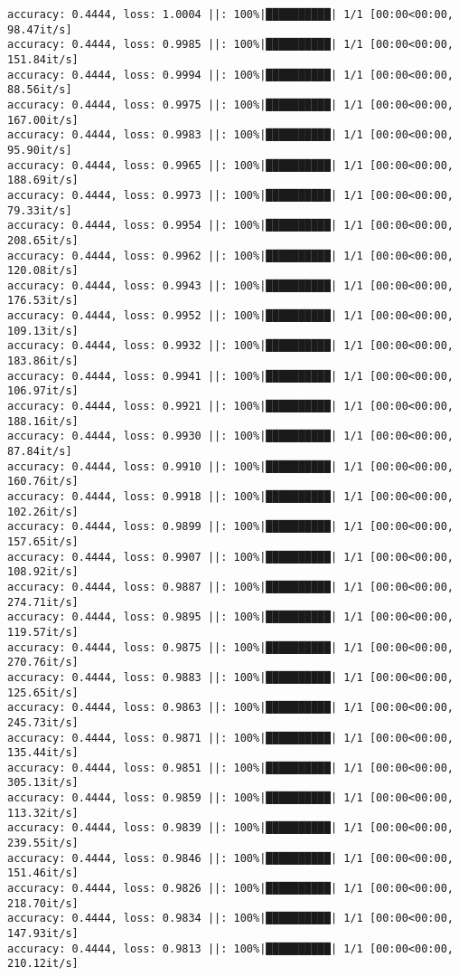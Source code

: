 \documentclass[
]{article}
\begin{document}
\begin{verbatim}
accuracy: 0.4444, loss: 1.0004 ||: 100%|██████████| 1/1 [00:00<00:00, 98.47it/s]
accuracy: 0.4444, loss: 0.9985 ||: 100%|██████████| 1/1 [00:00<00:00, 151.84it/s]
accuracy: 0.4444, loss: 0.9994 ||: 100%|██████████| 1/1 [00:00<00:00, 88.56it/s]
accuracy: 0.4444, loss: 0.9975 ||: 100%|██████████| 1/1 [00:00<00:00, 167.00it/s]
accuracy: 0.4444, loss: 0.9983 ||: 100%|██████████| 1/1 [00:00<00:00, 95.90it/s]
accuracy: 0.4444, loss: 0.9965 ||: 100%|██████████| 1/1 [00:00<00:00, 188.69it/s]
accuracy: 0.4444, loss: 0.9973 ||: 100%|██████████| 1/1 [00:00<00:00, 79.33it/s]
accuracy: 0.4444, loss: 0.9954 ||: 100%|██████████| 1/1 [00:00<00:00, 208.65it/s]
accuracy: 0.4444, loss: 0.9962 ||: 100%|██████████| 1/1 [00:00<00:00, 120.08it/s]
accuracy: 0.4444, loss: 0.9943 ||: 100%|██████████| 1/1 [00:00<00:00, 176.53it/s]
accuracy: 0.4444, loss: 0.9952 ||: 100%|██████████| 1/1 [00:00<00:00, 109.13it/s]
accuracy: 0.4444, loss: 0.9932 ||: 100%|██████████| 1/1 [00:00<00:00, 183.86it/s]
accuracy: 0.4444, loss: 0.9941 ||: 100%|██████████| 1/1 [00:00<00:00, 106.97it/s]
accuracy: 0.4444, loss: 0.9921 ||: 100%|██████████| 1/1 [00:00<00:00, 188.16it/s]
accuracy: 0.4444, loss: 0.9930 ||: 100%|██████████| 1/1 [00:00<00:00, 87.84it/s]
accuracy: 0.4444, loss: 0.9910 ||: 100%|██████████| 1/1 [00:00<00:00, 160.76it/s]
accuracy: 0.4444, loss: 0.9918 ||: 100%|██████████| 1/1 [00:00<00:00, 102.26it/s]
accuracy: 0.4444, loss: 0.9899 ||: 100%|██████████| 1/1 [00:00<00:00, 157.65it/s]
accuracy: 0.4444, loss: 0.9907 ||: 100%|██████████| 1/1 [00:00<00:00, 108.92it/s]
accuracy: 0.4444, loss: 0.9887 ||: 100%|██████████| 1/1 [00:00<00:00, 274.71it/s]
accuracy: 0.4444, loss: 0.9895 ||: 100%|██████████| 1/1 [00:00<00:00, 119.57it/s]
accuracy: 0.4444, loss: 0.9875 ||: 100%|██████████| 1/1 [00:00<00:00, 270.76it/s]
accuracy: 0.4444, loss: 0.9883 ||: 100%|██████████| 1/1 [00:00<00:00, 125.65it/s]
accuracy: 0.4444, loss: 0.9863 ||: 100%|██████████| 1/1 [00:00<00:00, 245.73it/s]
accuracy: 0.4444, loss: 0.9871 ||: 100%|██████████| 1/1 [00:00<00:00, 135.44it/s]
accuracy: 0.4444, loss: 0.9851 ||: 100%|██████████| 1/1 [00:00<00:00, 305.13it/s]
accuracy: 0.4444, loss: 0.9859 ||: 100%|██████████| 1/1 [00:00<00:00, 113.32it/s]
accuracy: 0.4444, loss: 0.9839 ||: 100%|██████████| 1/1 [00:00<00:00, 239.55it/s]
accuracy: 0.4444, loss: 0.9846 ||: 100%|██████████| 1/1 [00:00<00:00, 151.46it/s]
accuracy: 0.4444, loss: 0.9826 ||: 100%|██████████| 1/1 [00:00<00:00, 218.70it/s]
accuracy: 0.4444, loss: 0.9834 ||: 100%|██████████| 1/1 [00:00<00:00, 147.93it/s]
accuracy: 0.4444, loss: 0.9813 ||: 100%|██████████| 1/1 [00:00<00:00, 210.12it/s]

\end{verbatim}
\end{document}
